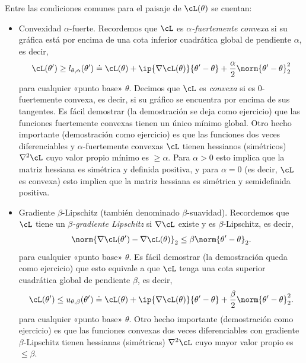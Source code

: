 \documentclass[../../book-main_es.tex]{subfiles}
\begin{document}
Entre las condiciones comunes para el paisaje de \(\cL(\theta)\) se cuentan:
\begin{itemize}
    \item Convexidad \(\alpha\)-fuerte. Recordemos que \(\cL\) es
        \textit{\(\alpha\)-fuertemente convexa} si su gráfica está por encima de una
        cota inferior cuadrática global de pendiente \(\alpha\), es decir,
        \begin{equation}
            \cL(\theta^{\prime}) \geq l_{\theta,
            \alpha}(\theta^{\prime}) \doteq \cL(\theta) + \ip{\nabla
            \cL(\theta)}{\theta^{\prime} - \theta} +
            \frac{\alpha}{2}\norm{\theta^{\prime} - \theta}_{2}^{2}
        \end{equation}
        para cualquier «punto base» \(\theta\). Decimos que \(\cL\) es
        \textit{convexa} si es \(0\)-fuertemente convexa, es decir, si su
        gráfico se encuentra por encima de sus tangentes. Es fácil demostrar (la demostración se deja como
        ejercicio) que las funciones fuertemente convexas tienen un único mínimo global.
        Otro hecho importante (demostración como ejercicio) es que
        las funciones dos veces diferenciables y \(\alpha\)-fuertemente convexas 
        \(\cL\) tienen hessianos (simétricos) \(\nabla^{2}\cL\) cuyo
        valor propio mínimo es \(\geq \alpha\). Para \(\alpha > 0\)
        esto implica que la matriz hessiana es simétrica y definida positiva, y
        para \(\alpha = 0\) (es decir, \(\cL\) es convexa) esto implica
        que la matriz hessiana es simétrica y semidefinida positiva.
    \item Gradiente \(\beta\)-Lipschitz (también denominado
        \(\beta\)-suavidad). Recordemos que \(\cL\) tiene
        un \textit{\(\beta\)-gradiente Lipschitz} si \(\nabla \cL\)
        existe y es \(\beta\)-Lipschitz, es decir,
        \begin{equation}
            \norm{\nabla \cL(\theta^{\prime}) - \nabla
            \cL(\theta)}_{2} \leq \beta \norm{\theta^{\prime} - \theta}_{2}.
        \end{equation}
        para cualquier «punto base» \(\theta\). Es fácil demostrar (la demostración
        queda como ejercicio) que esto equivale a que \(\cL\) tenga una
        cota superior cuadrática global de pendiente \(\beta\), es decir,
        \begin{equation}
            \cL(\theta^{\prime}) \leq u_{\theta,
            \beta}(\theta^{\prime}) \doteq \cL(\theta) + \ip{\nabla
            \cL(\theta)}{\theta^{\prime} - \theta} +
            \frac{\beta}{2}\norm{\theta^{\prime} - \theta}_{2}^{2}.
        \end{equation}
        para cualquier «punto base» \(\theta\). Otro hecho importante
        (demostración como ejercicio) es que las funciones convexas dos veces diferenciables con gradiente \(\beta\)-Lipschitz
        tienen hessianas (simétricas)
        \(\nabla^{2}\cL\) cuyo mayor valor propio es \(\leq \beta\).
\end{itemize}
\end{document}
